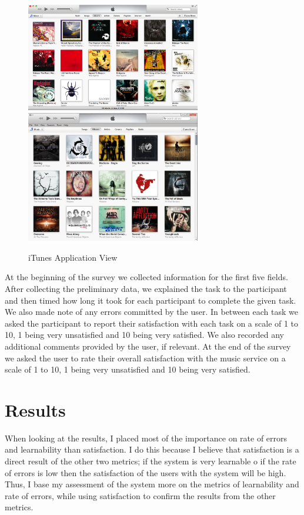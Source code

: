 \documentclass[11pt]{article}
\begin{document}
\begin{figure}[H] %
   \centering
   \includegraphics[width=3in]{iTunes_mac.png}       
   \includegraphics[width=3in]{iTunes_pc.jpg}
   \caption{iTunes Application View}
   \label{fig:iTunes_view}
\end{figure}

 
At the beginning of the survey we collected information for the first five fields. After collecting the preliminary data, we explained the task to the participant and then timed how long it took for each participant to complete the given task. We also made note of any errors committed by the user. In between each task we asked the participant to report their satisfaction with each task on a scale of 1 to 10, 1 being very unsatisfied and 10 being very satisfied. We also recorded any additional comments provided by the user, if relevant. At the end of the survey we asked the user to rate their overall satisfaction with the music service on a scale of 1 to 10, 1 being very unsatisfied and 10 being very satisfied.
\section{Results}
When looking at the results, I placed most of the importance on rate of errors and learnability than satisfaction. I do this because I believe that satisfaction is a direct result of the other two metrics; if the system is very learnable o if the rate of errors is low then the satisfaction of the users with the system will be high. Thus, I base my assessment of the system more on the metrics of learnability and rate of errors, while using satisfaction to confirm the results from the other metrics.
\end{document}
